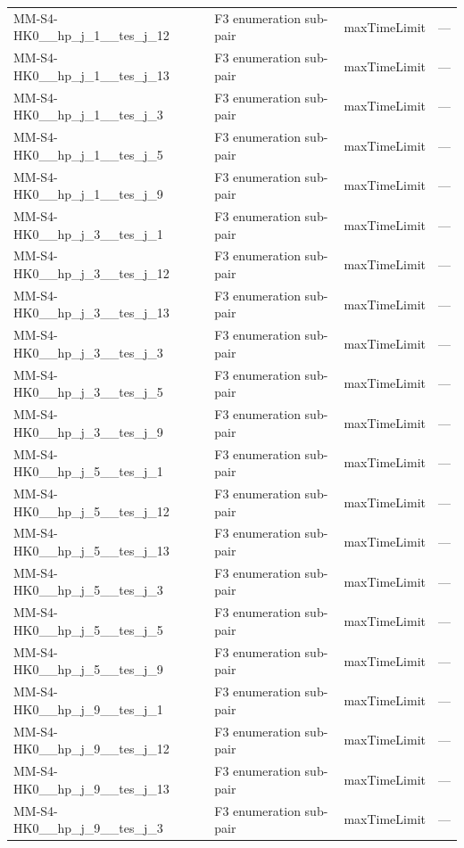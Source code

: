 \begin{table}[htbp]
\begin{tabular}{lllr}
  MM-S4-HK0\_\_hp\_j\_1\_\_tes\_j\_12 & F3 enumeration sub-pair & maxTimeLimit & — \\
  MM-S4-HK0\_\_hp\_j\_1\_\_tes\_j\_13 & F3 enumeration sub-pair & maxTimeLimit & — \\
  MM-S4-HK0\_\_hp\_j\_1\_\_tes\_j\_3 & F3 enumeration sub-pair & maxTimeLimit & — \\
  MM-S4-HK0\_\_hp\_j\_1\_\_tes\_j\_5 & F3 enumeration sub-pair & maxTimeLimit & — \\
  MM-S4-HK0\_\_hp\_j\_1\_\_tes\_j\_9 & F3 enumeration sub-pair & maxTimeLimit & — \\
  MM-S4-HK0\_\_hp\_j\_3\_\_tes\_j\_1 & F3 enumeration sub-pair & maxTimeLimit & — \\
  MM-S4-HK0\_\_hp\_j\_3\_\_tes\_j\_12 & F3 enumeration sub-pair & maxTimeLimit & — \\
  MM-S4-HK0\_\_hp\_j\_3\_\_tes\_j\_13 & F3 enumeration sub-pair & maxTimeLimit & — \\
  MM-S4-HK0\_\_hp\_j\_3\_\_tes\_j\_3 & F3 enumeration sub-pair & maxTimeLimit & — \\
  MM-S4-HK0\_\_hp\_j\_3\_\_tes\_j\_5 & F3 enumeration sub-pair & maxTimeLimit & — \\
  MM-S4-HK0\_\_hp\_j\_3\_\_tes\_j\_9 & F3 enumeration sub-pair & maxTimeLimit & — \\
  MM-S4-HK0\_\_hp\_j\_5\_\_tes\_j\_1 & F3 enumeration sub-pair & maxTimeLimit & — \\
  MM-S4-HK0\_\_hp\_j\_5\_\_tes\_j\_12 & F3 enumeration sub-pair & maxTimeLimit & — \\
  MM-S4-HK0\_\_hp\_j\_5\_\_tes\_j\_13 & F3 enumeration sub-pair & maxTimeLimit & — \\
  MM-S4-HK0\_\_hp\_j\_5\_\_tes\_j\_3 & F3 enumeration sub-pair & maxTimeLimit & — \\
  MM-S4-HK0\_\_hp\_j\_5\_\_tes\_j\_5 & F3 enumeration sub-pair & maxTimeLimit & — \\
  MM-S4-HK0\_\_hp\_j\_5\_\_tes\_j\_9 & F3 enumeration sub-pair & maxTimeLimit & — \\
  MM-S4-HK0\_\_hp\_j\_9\_\_tes\_j\_1 & F3 enumeration sub-pair & maxTimeLimit & — \\
  MM-S4-HK0\_\_hp\_j\_9\_\_tes\_j\_12 & F3 enumeration sub-pair & maxTimeLimit & — \\
  MM-S4-HK0\_\_hp\_j\_9\_\_tes\_j\_13 & F3 enumeration sub-pair & maxTimeLimit & — \\
  MM-S4-HK0\_\_hp\_j\_9\_\_tes\_j\_3 & F3 enumeration sub-pair & maxTimeLimit & — \\

\end{tabular}
\end{table}
